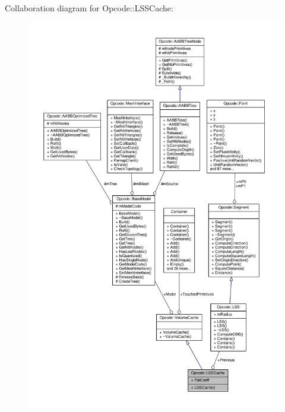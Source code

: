 Collaboration diagram for Opcode\+:\+:L\+S\+S\+Cache\+:
\nopagebreak
\begin{figure}[H]
\begin{center}
\leavevmode
\includegraphics[width=350pt]{d8/dda/structOpcode_1_1LSSCache__coll__graph}
\end{center}
\end{figure}
